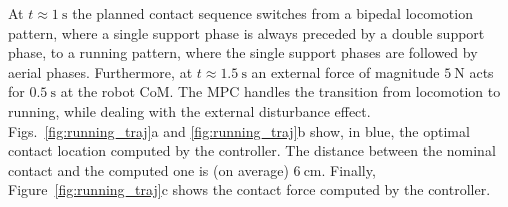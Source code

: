 At $t \approx \SI{1}{\second}$ the planned contact sequence switches from a bipedal locomotion pattern, where a single support phase is always preceded by a double support phase, to a running pattern, where the single support phases are followed by aerial phases. Furthermore, at $t \approx \SI{1.5}{\second}$ an external force of magnitude $\SI{5}{\newton}$ acts for $\SI{0.5}{\second}$ at the robot CoM.
The MPC handles the transition from locomotion to running, while dealing with the external disturbance effect. Figs.~\ref{fig:running_traj}a and \ref{fig:running_traj}b show, in blue, the optimal contact location computed by the controller. The distance between the nominal contact and the computed one is (on average) $\SI{6}{\centi\meter}$.
Finally, Figure~\ref{fig:running_traj}c shows the contact force computed by the controller.


